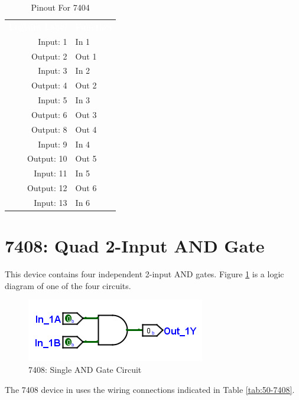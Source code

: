 \begin{table}[H]
	\sffamily
	\newcommand{\head}[1]{\textcolor{white}{\textbf{#1}}}		
	\begin{center}
		\begin{tabular}{rl} 
			\rowcolor{black!75}
			\head{Logisim Label} & \head{Function} \\
			Input: 1   & In 1  \\
			Output: 2  & Out 1  \\
			Input: 3   & In 2 \\
			Output: 4  & Out 2  \\
			Input: 5   & In 3  \\
			Output: 6  & Out 3 \\
			Output: 8  & Out 4  \\
			Input: 9   & In 4  \\
			Output: 10 & Out 5  \\
			Input: 11  & In 5  \\
			Output: 12 & Out 6 \\
			Input: 13  & In 6  \\
		\end{tabular}
	\end{center}
	\caption{Pinout For 7404}
	\label{tab:50-7404}
\end{table}

\section{7408: Quad 2-Input AND Gate}

This device contains four independent 2-input AND gates. Figure \ref{fig:50-7408} is a logic diagram of one of the four circuits.

\begin{figure}[H]
	\centering
	\includegraphics{gfx/50-7408}
	\caption{7408: Single AND Gate Circuit}
	\label{fig:50-7408}
\end{figure}

The 7408 device in \LE uses the wiring connections indicated in Table \ref{tab:50-7408}.


